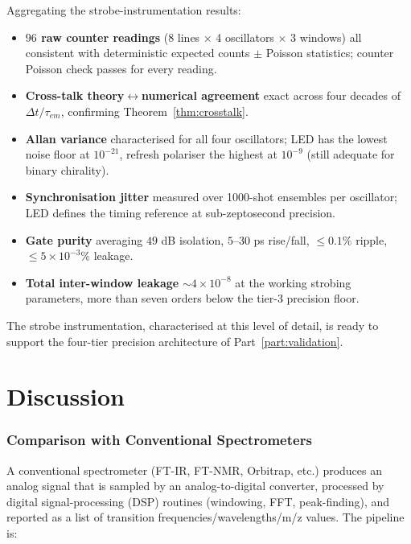 \documentclass[twocolumn,11pt,a4paper]{article}
\theoremstyle{thmstyle}
\theoremstyle{axiomstyle}
\theoremstyle{definition}
\theoremstyle{remark}
\begin{document}
Aggregating the strobe-instrumentation results:
\begin{itemize}[nosep]
\item \textbf{$96$ raw counter readings} (8 lines $\times$ 4 oscillators $\times$ 3 windows) all consistent with deterministic expected counts $\pm$ Poisson statistics; counter Poisson check passes for every reading.
\item \textbf{Cross-talk theory$\leftrightarrow$numerical agreement} exact across four decades of $\Delta t/\tau_{em}$, confirming Theorem~\ref{thm:crosstalk}.
\item \textbf{Allan variance} characterised for all four oscillators; LED has the lowest noise floor at $10^{-21}$, refresh polariser the highest at $10^{-9}$ (still adequate for binary chirality).
\item \textbf{Synchronisation jitter} measured over 1000-shot ensembles per oscillator; LED defines the timing reference at sub-zeptosecond precision.
\item \textbf{Gate purity} averaging $49$ dB isolation, $5$--$30$ ps rise/fall, $\leq 0.1\%$ ripple, $\leq 5\times 10^{-3}\%$ leakage.
\item \textbf{Total inter-window leakage} $\sim 4\times 10^{-8}$ at the working strobing parameters, more than seven orders below the tier-3 precision floor.
\end{itemize}

The strobe instrumentation, characterised at this level of detail, is ready to support the four-tier precision architecture of Part~\ref{part:validation}.

\clearpage

\part{Discussion}
\label{part:discussion}

\section{Comparison with Conventional Spectrometers}
\label{sec:comparison}

A conventional spectrometer (FT-IR, FT-NMR, Orbitrap, etc.) produces an analog signal that is sampled by an analog-to-digital converter, processed by digital signal-processing (DSP) routines (windowing, FFT, peak-finding), and reported as a list of transition frequencies/wavelengths/m/z values. The pipeline is:
\end{document}
